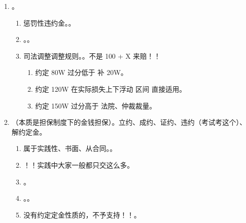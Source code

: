 \begin{enumerate}
\begin{enumerate}
\begin{enumerate}
                  \item 可预见性规则。。
                  \item 减损规则。违约方应采取适当措施，防止损失扩大。
                \end{enumerate}
          \item {}。
                \begin{enumerate}
                  \item 惩罚性违约金。。
                  \item {}。。
                  \item 司法调整调整规则。。不是 100 + X 来赔！！
                        \begin{enumerate}
                          \item 约定 80W \yjt 过分低于 \yjt 补 20W。
                          \item 约定 120W \yjt 在实际损失上下浮动  区间 \yjt 直接适用。
                          \item 约定 150W \yjt 过分高于 \yjt [100, 130] 法院、仲裁裁量。
                        \end{enumerate}
                \end{enumerate}
          \item {}（本质是担保制度下的金钱担保）。立约、成约、证约、违约（考试考这个）、解约定金。
                \begin{enumerate}
                  \item 属于实践性、书面、从合同。。
                  \item {}！！实践中大家一般都只交这么多。
                  \item {}。
                  \item {}。。
                  \item 没有约定定金性质的，不予支持！！。
                \end{enumerate}
        \end{enumerate}
\end{enumerate}
